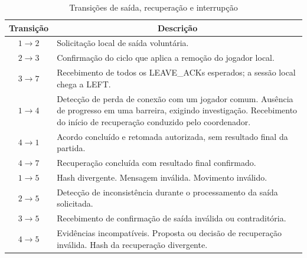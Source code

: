\documentclass[11pt,a4paper]{article}
\begin{document}
\begin{table}[H]
    \centering
    \caption{Transições de saída, recuperação e interrupção}
    \label{tab:fsm_falhas_transicoes}
    \begin{tabular}{|c|p{11.7cm}|}
        \hline
        \textbf{Transição} &
        \multicolumn{1}{c|}{\textbf{Descrição}} \\ \hline

        $1 \rightarrow 2$ &
        Solicitação local de saída voluntária. \\ \hline

        $2 \rightarrow 3$ &
        Confirmação do ciclo que aplica a remoção do jogador local. \\ \hline

        $3 \rightarrow 7$ &
        Recebimento de todos os LEAVE\_ACKs esperados; a sessão local chega a LEFT. \\ \hline

        $1 \rightarrow 4$ &
        Detecção de perda de conexão com um jogador comum.
        \newline
        Ausência de progresso em uma barreira, exigindo investigação.
        \newline
        Recebimento do início de recuperação conduzido pelo coordenador. \\ \hline

        $4 \rightarrow 1$ &
        Acordo concluído e retomada autorizada, sem resultado final da partida. \\ \hline

        $4 \rightarrow 7$ &
        Recuperação concluída com resultado final confirmado. \\ \hline

        $1 \rightarrow 5$ &
        Hash divergente.
        \newline
        Mensagem inválida.
        \newline
        Movimento inválido. \\ \hline

        $2 \rightarrow 5$ &
        Detecção de inconsistência durante o processamento da saída solicitada. \\ \hline

        $3 \rightarrow 5$ &
        Recebimento de confirmação de saída inválida ou contraditória. \\ \hline

        $4 \rightarrow 5$ &
        Evidências incompatíveis.
        \newline
        Proposta ou decisão de recuperação inválida.
        \newline
        Hash da recuperação divergente. \\ \hline


\end{tabular}
\end{table}
\end{document}
